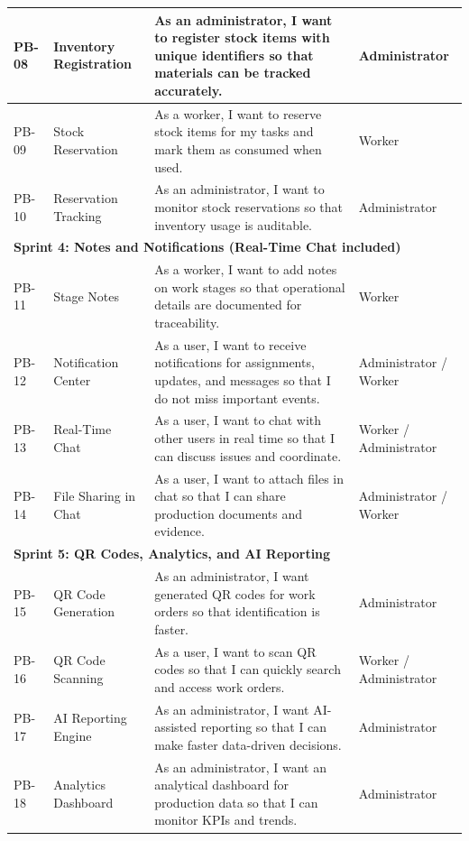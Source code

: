 \begin{longtable}{|p{}|p{}|p{}|p{}|}
    PB-08 & Inventory Registration & As an administrator, I want to register stock items with unique identifiers so that materials can be tracked accurately. & Administrator \\
    \hline
    PB-09 & Stock Reservation & As a worker, I want to reserve stock items for my tasks and mark them as consumed when used. & Worker \\
    \hline
    PB-10 & Reservation Tracking & As an administrator, I want to monitor stock reservations so that inventory usage is auditable. & Administrator \\
    \hline
    \multicolumn{4}{|l|}{\textbf{Sprint 4: Notes and Notifications (Real-Time Chat included)}} \\
    \hline
    PB-11 & Stage Notes & As a worker, I want to add notes on work stages so that operational details are documented for traceability. & Worker \\
    \hline
    PB-12 & Notification Center & As a user, I want to receive notifications for assignments, updates, and messages so that I do not miss important events. & Administrator / Worker \\
    \hline
    PB-13 & Real-Time Chat & As a user, I want to chat with other users in real time so that I can discuss issues and coordinate. & Worker / Administrator \\
    \hline
    PB-14 & File Sharing in Chat & As a user, I want to attach files in chat so that I can share production documents and evidence. & Administrator / Worker \\
    \hline
    \multicolumn{4}{|l|}{\textbf{Sprint 5: QR Codes, Analytics, and AI Reporting}} \\
    \hline
    PB-15 & QR Code Generation & As an administrator, I want generated QR codes for work orders so that identification is faster. & Administrator \\
    \hline
    PB-16 & QR Code Scanning & As a user, I want to scan QR codes so that I can quickly search and access work orders. & Worker / Administrator \\
    \hline
    PB-17 & AI Reporting Engine & As an administrator, I want AI-assisted reporting so that I can make faster data-driven decisions. & Administrator \\
    \hline
    PB-18 & Analytics Dashboard & As an administrator, I want an analytical dashboard for production data so that I can monitor KPIs and trends. & Administrator \\
    \hline
\end{longtable}
\normalsize
